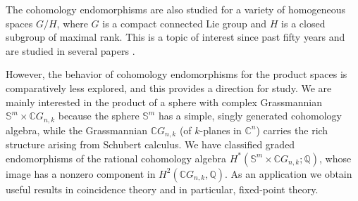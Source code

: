 \documentclass{amsart}
\begin{document}
	The cohomology endomorphisms are also studied for a variety of homogeneous spaces $G/H$, where $G$ is a compact connected Lie group and $H$ is a closed
	subgroup of maximal rank. This is a topic of interest since past fifty years and are studied %
in several papers %
\cite{shiga-tezuka2, brewster-homer, hoffman-homer, Papadima, duan, duan-fang, duan-zhao, lin, goswami-sarkar}. 
	
    However, the behavior of %
cohomology endomorphisms for %
the product spaces %
is comparatively less explored, and this provides a direction for study.
    We are mainly interested in the product of a sphere
	with complex Grassmannian $\mathbb S^m\times \mathbb CG_{n,k}$ because the sphere $\mathbb{S}^m$ has a simple, singly generated cohomology algebra, while the Grassmannian $\mathbb{C}G_{n,k}$ (of $k$-planes in $\mathbb C^n$)
	carries the rich structure arising from Schubert calculus. We have %
classified graded endomorphisms %
of the rational cohomology algebra $H^*(\mathbb{S}^m \times \mathbb{C}G_{n,k};\mathbb{Q})$, whose image has a nonzero component in $H^2(\mathbb CG_{n,k},\mathbb Q)$.  As an application we obtain useful results in coincidence theory and in particular, fixed-point theory.  
	
\end{document}
